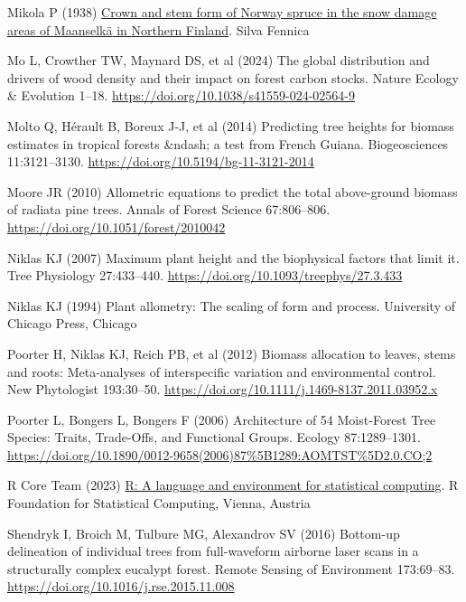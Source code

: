 \documentclass[
  12pt,
  letterpaper,
  DIV=11,
  numbers=noendperiod]{scrartcl}
\newlength{\cslhangindent}
\newenvironment{CSLReferences}[2] %
 {\begin{list}{}{%
  \setlength{\itemindent}{0pt}
  \setlength{\leftmargin}{0pt}
  \setlength{\parsep}{0pt}
  \ifodd #1
   \setlength{\leftmargin}{\cslhangindent}
   \setlength{\itemindent}{-1\cslhangindent}
  \fi
  \setlength{\itemsep}{#2\baselineskip}}}
 {\end{list}}
\begin{document}
\begin{CSLReferences}{1}{1}
Mikola P (1938) \href{https://www.silvafennica.fi/article/4546}{Crown
and stem form of {Norway} spruce in the snow damage areas of {Maanselkä}
in {Northern} {Finland}}. Silva Fennica

Mo L, Crowther TW, Maynard DS, et al (2024) The global distribution and
drivers of wood density and their impact on forest carbon stocks. Nature
Ecology \& Evolution 1--18.
\url{https://doi.org/10.1038/s41559-024-02564-9}

Molto Q, Hérault B, Boreux J-J, et al (2014) Predicting tree heights for
biomass estimates in tropical forests \&ndash; a test from {French}
{Guiana}. Biogeosciences 11:3121--3130.
\url{https://doi.org/10.5194/bg-11-3121-2014}

Moore JR (2010) Allometric equations to predict the total above-ground
biomass of radiata pine trees. Annals of Forest Science 67:806--806.
\url{https://doi.org/10.1051/forest/2010042}

Niklas KJ (2007) Maximum plant height and the biophysical factors that
limit it. Tree Physiology 27:433--440.
\url{https://doi.org/10.1093/treephys/27.3.433}

Niklas KJ (1994) Plant allometry: The scaling of form and process.
University of Chicago Press, Chicago

Poorter H, Niklas KJ, Reich PB, et al (2012) Biomass allocation to
leaves, stems and roots: Meta-analyses of interspecific variation and
environmental control. New Phytologist 193:30--50.
\url{https://doi.org/10.1111/j.1469-8137.2011.03952.x}

Poorter L, Bongers L, Bongers F (2006) Architecture of 54
{Moist}-{Forest} {Tree} {Species}: {Traits}, {Trade}-{Offs}, and
{Functional} {Groups}. Ecology 87:1289--1301.
\url{https://doi.org/10.1890/0012-9658(2006)87\%5B1289:AOMTST\%5D2.0.CO;2}

R Core Team (2023) \href{https://www.R-project.org/}{R: A language and
environment for statistical computing}. R Foundation for Statistical
Computing, Vienna, Austria

Shendryk I, Broich M, Tulbure MG, Alexandrov SV (2016) Bottom-up
delineation of individual trees from full-waveform airborne laser scans
in a structurally complex eucalypt forest. Remote Sensing of Environment
173:69--83. \url{https://doi.org/10.1016/j.rse.2015.11.008}


\end{CSLReferences}
\end{document}
